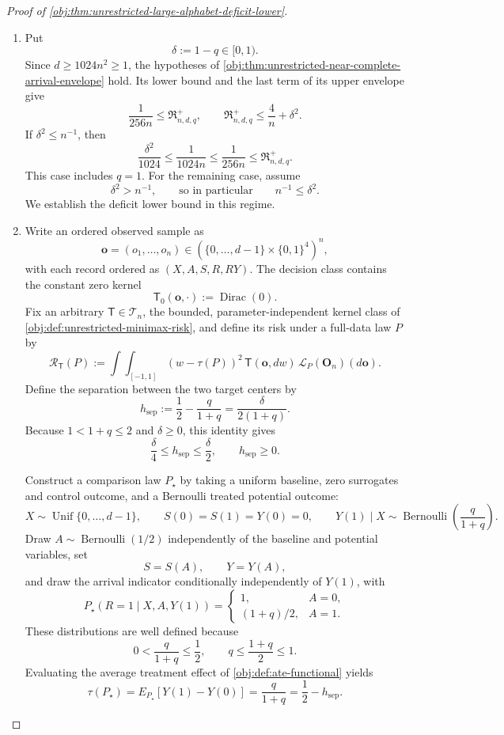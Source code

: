 \documentclass[11pt]{article}
\begin{document}
\begin{proof}[Proof of \cref{obj:thm:unrestricted-large-alphabet-deficit-lower}]
\begin{enumerate}
\item Put
\[
\delta:=1-q\in[0,1).
\]
Since \(d\ge1024n^2\ge1\), the hypotheses of
\cref{obj:thm:unrestricted-near-complete-arrival-envelope} hold. Its lower bound and the last term of its upper envelope give
\[
\frac1{256n}\le\mathfrak R^{+}_{n,d,q},
\qquad
\mathfrak R^{+}_{n,d,q}\le\frac4n+\delta^2.
\]
If \(\delta^2\le n^{-1}\), then
\[
\frac{\delta^2}{1024}
\le\frac1{1024n}
\le\frac1{256n}
\le\mathfrak R^{+}_{n,d,q}.
\]
This case includes \(q=1\). For the remaining case, assume
\[
\delta^2>n^{-1},
\qquad\text{so in particular}\qquad n^{-1}\le\delta^2.
\]
We establish the deficit lower bound in this regime. %

\item Write an ordered observed sample as
\[
\mathbf o=(o_1,\ldots,o_n)
\in\left(\{0,\ldots,d-1\}\times\{0,1\}^4\right)^n,
\]
with each record ordered as \((X,A,S,R,RY)\). The decision class contains the constant zero kernel
\[
\mathsf T_0(\mathbf o,\cdot):=\operatorname{Dirac}(0).
\]
Fix an arbitrary \(\mathsf T\in\mathcal T_n\), the bounded, parameter-independent kernel class of
\cref{obj:def:unrestricted-minimax-risk}, and define its risk under a full-data law \(P\) by
\[
\mathcal R_{\mathsf T}(P)
:=
\int\!\int_{[-1,1]}
(w-\tau(P))^2\,
\mathsf T(\mathbf o,dw)\,
\mathcal L_P(\mathbf O_n)(d\mathbf o).
\]
Define the separation between the two target centers by
\[
h_{\mathrm{sep}}
:=\frac12-\frac q{1+q}
=\frac{\delta}{2(1+q)}.
\]
Because \(1<1+q\le2\) and \(\delta\ge0\), this identity gives
\[
\frac{\delta}{4}\le h_{\mathrm{sep}}\le\frac{\delta}{2},
\qquad h_{\mathrm{sep}}\ge0.
\]

Construct a comparison law \(P_\star\) by taking a uniform baseline, zero surrogates and control outcome, and a Bernoulli treated potential outcome:
\[
X\sim\operatorname{Unif}\{0,\ldots,d-1\},
\qquad
S(0)=S(1)=Y(0)=0,
\qquad
Y(1)\mid X\sim\operatorname{Bernoulli}\!\left(\frac q{1+q}\right).
\]
Draw \(A\sim\operatorname{Bernoulli}(1/2)\) independently of the baseline and potential variables, set
\[
S=S(A),\qquad Y=Y(A),
\]
and draw the arrival indicator conditionally independently of \(Y(1)\), with
\[
P_\star(R=1\mid X,A,Y(1))
=
\begin{cases}
1,&A=0,\\
(1+q)/2,&A=1.
\end{cases}
\]
These distributions are well defined because
\[
0<\frac q{1+q}\le\frac12,
\qquad
q\le\frac{1+q}{2}\le1.
\]
Evaluating the average treatment effect of
\cref{obj:def:ate-functional} yields
\[
\tau(P_\star)
=E_{P_\star}[Y(1)-Y(0)]
=\frac q{1+q}
=\frac12-h_{\mathrm{sep}}.
\]


\end{enumerate}
\end{proof}
\end{document}

